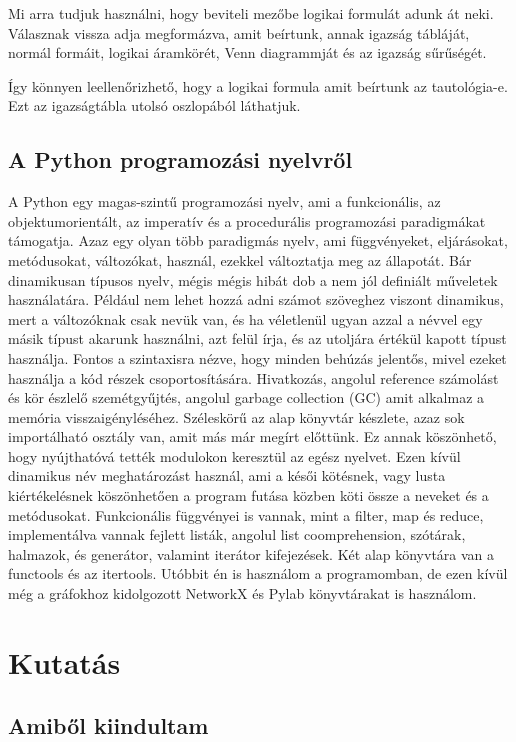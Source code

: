 \documentclass[
]{thesis-ekf}
\theoremstyle{definition}
\theoremstyle{remark}
\begin{document}
	Mi arra tudjuk használni, hogy beviteli mezőbe logikai formulát adunk át neki. Válasznak vissza adja megformázva, amit beírtunk, annak igazság tábláját, normál formáit, logikai áramkörét, Venn diagrammját és az igazság sűrűségét.
	
	Így könnyen leellenőrizhető, hogy a logikai formula amit beírtunk az tautológia-e. Ezt az igazságtábla utolsó oszlopából láthatjuk.
	
	\section{A Python programozási nyelvről}\label{python-programnyelv}
	A Python egy magas-szintű programozási nyelv, ami a funkcionális, az objektumorientált, az imperatív és a procedurális programozási paradigmákat támogatja. Azaz egy olyan több paradigmás nyelv, ami függvényeket, eljárásokat, metódusokat, változókat, használ, ezekkel változtatja meg az állapotát. Bár dinamikusan típusos nyelv, mégis mégis hibát dob a nem jól definiált műveletek használatára. Például nem lehet hozzá adni számot szöveghez viszont dinamikus, mert a változóknak csak nevük van, és ha véletlenül ugyan azzal a névvel egy másik típust akarunk használni, azt felül írja, és az utoljára értékül kapott típust használja. Fontos a szintaxisra nézve, hogy minden behúzás jelentős, mivel ezeket használja a kód részek csoportosítására. Hivatkozás, angolul reference számolást és kör észlelő szemétgyűjtés, angolul garbage collection (GC) amit alkalmaz a memória visszaigényléséhez. Széleskörű az alap könyvtár készlete, azaz sok importálható osztály van, amit más már megírt előttünk. Ez annak köszönhető, hogy nyújthatóvá tették modulokon keresztül az egész nyelvet. Ezen kívül dinamikus név meghatározást használ, ami a késői kötésnek, vagy lusta kiértékelésnek köszönhetően a program futása közben köti össze a neveket és a metódusokat. Funkcionális függvényei is vannak, mint a filter, map és reduce, implementálva vannak fejlett listák, angolul list coomprehension, szótárak, halmazok, és generátor, valamint iterátor kifejezések. Két alap könyvtára van a functools és az itertools. Utóbbit én is használom a programomban, de ezen kívül még a gráfokhoz kidolgozott NetworkX és Pylab könyvtárakat is használom.
	
	\chapter{Kutatás}
	\section{Amiből kiindultam}
	
\end{document}
